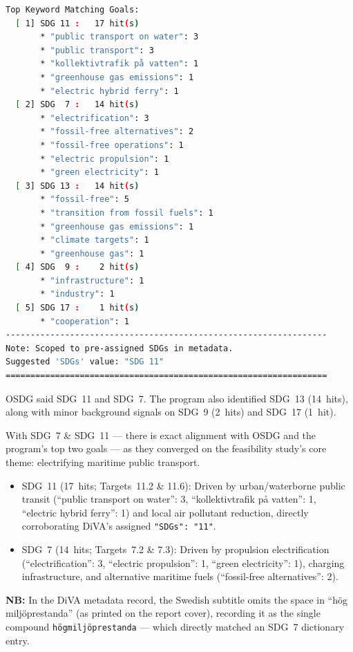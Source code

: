 \begin{casestudySection}
\begin{lstlisting}[language={bash}, basicstyle=\footnotesize, escapechar=|, breaklines=true,
    postbreak=\usebox{\lstbreakbox}, caption={Program's output}, label=lst:t_144936Output]
Top Keyword Matching Goals:
  [ 1] SDG 11 :   17 hit(s)
       * "public transport on water": 3
       * "public transport": 3
       * "kollektivtrafik på vatten": 1
       * "greenhouse gas emissions": 1
       * "electric hybrid ferry": 1
  [ 2] SDG  7 :   14 hit(s)
       * "electrification": 3
       * "fossil-free alternatives": 2
       * "fossil-free operations": 1
       * "electric propulsion": 1
       * "green electricity": 1
  [ 3] SDG 13 :   14 hit(s)
       * "fossil-free": 5
       * "transition from fossil fuels": 1
       * "greenhouse gas emissions": 1
       * "climate targets": 1
       * "greenhouse gas": 1
  [ 4] SDG  9 :    2 hit(s)
       * "infrastructure": 1
       * "industry": 1
  [ 5] SDG 17 :    1 hit(s)
       * "cooperation": 1
-----------------------------------------------------------------
Note: Scoped to pre-assigned SDGs in metadata.
Suggested 'SDGs' value: "SDG 11"
=================================================================
\end{lstlisting}

OSDG said \gls{SDG}~11 and \gls{SDG}~7. The program also identified \gls{SDG}~13 (\num{14}~hits), along with minor background signals on \gls{SDG}~9 (\num{2}~hits) and \gls{SDG}~17 (\num{1}~hit).

With \gls{SDG}~7 \& \gls{SDG}~11 --- there is exact alignment with OSDG and the program's top two goals --- as they converged on the feasibility study's core theme: electrifying maritime public transport.
\begin{itemize}
    \item \gls{SDG}~11 (\num{17}~hits; Targets~11.2 \& 11.6): Driven by urban/waterborne public transit (\enquote{public transport on water}: 3, \enquote{\foreignlanguage{swedish}{kollektivtrafik på vatten}}: 1, \enquote{electric hybrid ferry}: 1) and local air pollutant reduction, directly corroborating \gls{DiVA}'s assigned \texttt{"SDGs": "11"}.

    \item \gls{SDG}~7 (\num{14}~hits; Targets~7.2 \& 7.3): Driven by propulsion electrification (\enquote{electrification}: 3, \enquote{electric propulsion}: 1, \enquote{green electricity}: 1), charging infrastructure, and alternative maritime fuels (\enquote{fossil-free alternatives}: 2).
\end{itemize}
\textbf{NB:} In the \gls{DiVA} metadata record, the Swedish subtitle omits the space in \enquote{\foreignlanguage{swedish}{hög miljöprestanda}} (as printed on the report cover), recording it as the single compound \texttt{\foreignlanguage{swedish}{högmiljöprestanda}} --- which directly matched an \gls{SDG}~7 dictionary entry.


\end{casestudySection}
